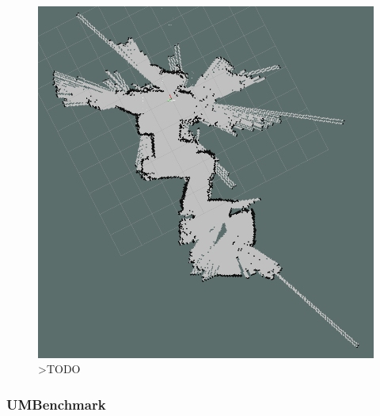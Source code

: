 \begin{figure}[ht]
	\centering
		\includegraphics[width=0.8\linewidth]{rys/2020-11-04-170347_1920x1080_scrot.PNG}
	\caption{>TODO}
	\label{fig:xxx}
\end{figure}








\subsubsection{UMBenchmark\cite{Borenstein1995}}


